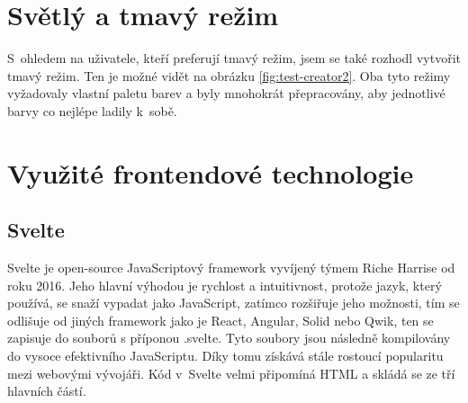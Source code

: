 \documentclass[12pt, a4paper,
openright
]{report}
\begin{document}
\section{Světlý a tmavý režim}
S~ohledem na uživatele, kteří preferují tmavý režim, jsem se také rozhodl vytvořit tmavý režim. Ten je možné vidět na obrázku \ref{fig:test-creator2}. Oba tyto režimy vyžadovaly vlastní paletu barev a byly mnohokrát přepracovány, aby jednotlivé barvy co nejlépe ladily k~sobě.

\section{Využité frontendové technologie}
\subsection{Svelte}
Svelte je open-source JavaScriptový framework vyvíjený týmem Riche Harrise od roku 2016. Jeho hlavní výhodou je rychlost a intuitivnost, protože jazyk, který používá, se snaží vypadat jako JavaScript, zatímco rozšiřuje jeho možnosti, tím se odlišuje od jiných framework jako je React, Angular, Solid nebo Qwik, ten se zapisuje do souborů s příponou .svelte. Tyto soubory jsou následně kompilovány do vysoce efektivního JavaScriptu. Díky tomu získává stále rostoucí popularitu mezi webovými vývojáři. Kód v~Svelte velmi připomíná HTML a skládá se ze tří hlavních částí.
\end{document}
